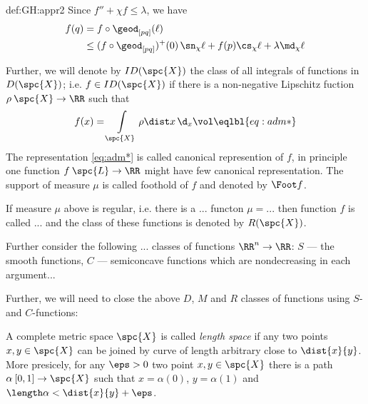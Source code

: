 {\begin{subthm}{def:GH:appr2}
Since $f''+\chi f\le \lambda$, we have
\begin{align*}
{f(q)}&=f\circ\geod_{[p q]}(\ell)\\
&\le(f\circ\geod_{[p q]})^+(0)\,{\sn_\chi\ell}+f(p)\cs_\chi\ell+\lambda\md_\chi\ell
\end{align*}




















Further, we will denote by $ID(\spc{X})$ the class of all integrals of functions in $D(\spc{X})$;
i.e. $f\in ID(\spc{X})$ if there is a non-negative Lipschitz fuction $\rho\:\spc{X}\to\RR$ such that 
$$f(x)=\int\limits_\spc{X}\rho\dist x\,\d_x\vol\eqlbl{eq:adm*}$$
The representation \ref{eq:adm*} is called canonical represention of $f$, in principle one function $f\:\spc{L}\to \RR$ might have few canonical representation.
The support of measure $\mu$ is called foothold of $f$ and denoted by $\Foot f$.

If measure $\mu$ above is regular, i.e. there is a ... functon $\mu=...$ then function $f$ is called ... and the class of these functions is denoted by $R(\spc{X})$.

Further consider the following ... classes of functions $\RR^n\to\RR$:
$S$ --- the smooth functions, $C$ --- semiconcave functions which are nondecreasing in each argument...



Further, we will need to close the above $D$, $M$ and $R$ classes of functions using $S$- and $C$-functions:




















A complete metric space $\spc{X}$ is called \emph{length space} if any two points $x,y\in \spc{X}$ can be joined by curve of length arbitrary close to $\dist{x}{y}$.
More presicely, for any $\eps>0$ two point $x,y\in \spc{X}$ there is a path $\alpha\:[0,1]\to\spc{X}$  such that $x=\alpha(0)$, $y=\alpha(1)$ and $\length\alpha<\dist{x}{y}+\eps$.


\end{subthm}}
